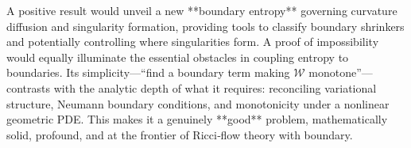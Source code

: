 A positive result would unveil a new **boundary entropy** governing curvature diffusion and singularity formation, providing tools to classify boundary shrinkers and potentially controlling where singularities form.  A proof of impossibility would equally illuminate the essential obstacles in coupling entropy to boundaries.  Its simplicity—“find a boundary term making \(\mathcal W\) monotone”—contrasts with the analytic depth of what it requires: reconciling variational structure, Neumann boundary conditions, and monotonicity under a nonlinear geometric PDE.  This makes it a genuinely **good** problem, mathematically solid, profound, and at the frontier of Ricci‑flow theory with boundary.